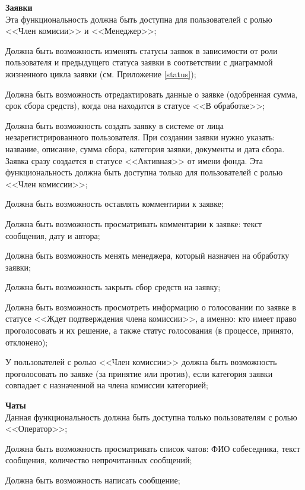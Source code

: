 \begin{subreg}
    \item \textbf{Заявки\\}
    Эта функциональность должна быть доступна для пользователей с ролью <<Член комисии>> и <<Менеджер>>;
    \begin{subreg}
    \item \label{req:status} Должна быть возможность изменять статусы заявок в зависимости от роли пользователя и предыдущего статуса заявки в соответствии с диаграммой жизненного цикла заявки (см. Приложение \ref{status});
    \item Должна быть возможность отредактировать данные о заявке (одобренная сумма, срок сбора средств), когда она находится в статусе <<В обработке>>; 
    \item Должна быть возможность создать заявку в системе от лица незарегистрированного пользователя. При создании заявки нужно указать: название,  описание, сумма сбора, категория заявки, документы и дата сбора. Заявка сразу создается в статусе <<Активная>> от имени фонда. Эта функциональность должна быть доступна только для пользователей с ролью <<Член комиссии>>;
    \item Должна быть возможность оставлять комментирии к заявке;
    \item Должна быть возможность просматривать комментарии к заявке: текст сообщения, дату и автора;
    \item Должна быть возможность менять менеджера, который назначен на обработку заявки;
    \item Должна быть возможность закрыть сбор средств на заявку;
    \item Должна быть возможность просмотреть информацию о голосовании по заявке в статусе <<Ждет подтверждения члена комиссии>>, а именно: кто имеет право проголосовать и их решение, а также статус голосования (в процессе, принято, отклонено);
    \item У пользователей с ролью <<Член комиссии>> должна быть возможность проголосовать по заявке (за принятие или против), если категория заявки совпадает с назначенной на члена комиссии категорией;
    \end{subreg}
    
    \item \textbf{Чаты\\} \label{req:chats}
    Данная функциональность должна быть доступна только пользователям с ролью <<Оператор>>;

    \begin{subreg}
    \item Должна быть возможность просматривать список чатов: ФИО собеседника, текст сообщения, количество непрочитанных сообщений;
    \item Должна быть возможность написать сообщение;
    \end{subreg}
    

\end{subreg}

